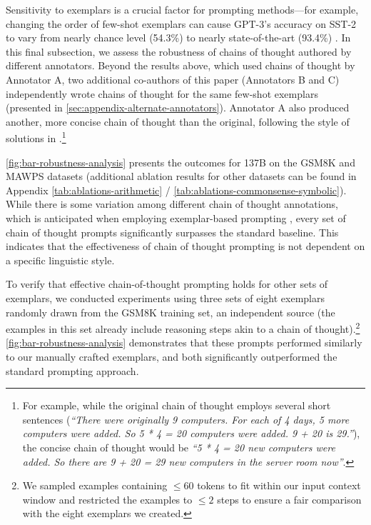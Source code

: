 Sensitivity to exemplars is a crucial factor for prompting methods—for example, changing the order of few-shot exemplars can cause GPT-3’s accuracy on SST-2 to vary from nearly chance level (54.3\%) to nearly state-of-the-art (93.4\%) \citep{zhao2021calibrate}. In this final subsection, we assess the robustness of chains of thought authored by different annotators. Beyond the results above, which used chains of thought by Annotator A, two additional co-authors of this paper (Annotators B and C) independently wrote chains of thought for the same few-shot exemplars (presented in \cref{sec:appendix-alternate-annotators}). Annotator A also produced another, more concise chain of thought than the original, following the style of solutions in \citet{cobbe2021training}.\footnote{For example, while the original chain of thought employs several short sentences (\textit{``There were originally 9 computers. For each of 4 days, 5 more computers were added. So 5 * 4 = 20 computers were added. 9 + 20 is 29.''}), the concise chain of thought would be \textit{``5 * 4 = 20 new computers were added. So there are 9 + 20 = 29 new computers in the server room now''}.}

\cref{fig:bar-robustness-analysis} presents the outcomes for \lamda{} 137B on the GSM8K and MAWPS datasets (additional ablation results for other datasets can be found in Appendix \cref{tab:ablations-arithmetic} / \cref{tab:ablations-commonsense-symbolic}). While there is some variation among different chain of thought annotations, which is anticipated when employing exemplar-based prompting \citep{le-scao-rush-2021-many,reynolds2021prompt,zhao2021calibrate}, every set of chain of thought prompts significantly surpasses the standard baseline. This indicates that the effectiveness of chain of thought prompting is not dependent on a specific linguistic style.

To verify that effective chain-of-thought prompting holds for other sets of exemplars, we conducted experiments using three sets of eight exemplars randomly drawn from the GSM8K training set, an independent source (the examples in this set already include reasoning steps akin to a chain of thought).\footnote{We sampled examples containing $\leq 60$ tokens to fit within our input context window and restricted the examples to $\leq 2$ steps to ensure a fair comparison with the eight exemplars we created.} \cref{fig:bar-robustness-analysis} demonstrates that these prompts performed similarly to our manually crafted exemplars, and both significantly outperformed the standard prompting approach.

